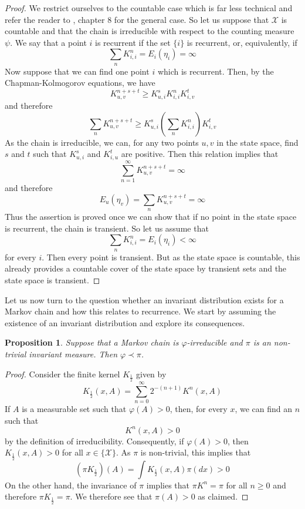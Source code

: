\documentclass[a4paper, draft]{article}
\theoremstyle{own}
\newtheorem{prop}[thm]{Proposition}
\theoremstyle{remark}
\begin{document}
\begin{proof}
	We restrict ourselves to the countable case which is far less technical and refer the reader to \cite{MeynTweedie}, chapter 8 for the general case. So let us suppose that ${\mathcal X}$ is countable and that the chain is irreducible with respect to the counting measure $\psi$. We say that a point $i$ is recurrent if the set $\{ i \}$ is recurrent, or, equivalently, if
	$$
	\sum_n K^n_{i,i} =  E_i(\eta_i) = \infty
	$$
	Now suppose that we can find one point $i$ which is recurrent. Then, by the Chapman-Kolmogorov equations, we have
	$$
	K^{n+s+t}_{u,v} \geq K^s_{u,i} K^n_{i,i} K^t_{i,v}
	$$
	and therefore
	$$
	\sum_n K^{n+s+t}_{u,v} \geq K^s_{u,i} (\sum_n K^n_{i,i}) K^t_{i,v}
	$$
	As the chain is irreducible, we can, for any two points $u,v$ in the state space, find $s$ and $t$ such that  $K^s_{u,i}$ and $K^t_{i,u}$ are positive. Then this relation implies that
	$$
	\sum_{n=1}^\infty K^{n+s+t}_{u,v} = \infty
	$$
	and therefore
	$$
	E_u(\eta_v) = \sum_n K^{n+s+t}_{u,v} = \infty
	$$
	Thus the assertion is proved once we can show that if no point in the state space is recurrent, the chain is transient. So let us assume that
	$$
	\sum_n K^n_{i,i} =  E_i(\eta_i) < \infty
	$$
	for every $i$. Then every point is transient. But as the state space is countable, this already provides a countable cover of the state space by transient sets and the state space is transient.
\end{proof}



Let us now turn to the question whether an invariant distribution exists for a Markov chain and how this relates to recurrence. We start by assuming the existence of an invariant distribution and explore its consequences. 

\begin{prop}\label{prop:invariantimpliesmaximal}
	Suppose that a Markov chain is $\varphi$-irreducible and $\pi$ is an non-trivial invariant measure. Then
	$\varphi \prec \pi$.
\end{prop}

\begin{proof}
	Consider the finite kernel $K_{\frac{1}{2}}$ given by
	$$
	K_{\frac{1}{2}} (x,A) = \sum_{n=0}^\infty 2^{-(n+1)} K^n(x,A)
	$$
	If $A$ is a measurable set such that $\varphi(A) > 0$, then, for every $x$, we can find an $n$ such that
	$$
	K^n(x,A) > 0
	$$
	by the definition of irreducibility. Consequently, if $\varphi(A) > 0$, then $K_{\frac{1}{2}}(x,A) > 0$ for all $x \in \{\mathcal X\}$. As $\pi$ is non-trivial, this implies that
	$$
	(\pi K_{\frac{1}{2}})(A) = \int K_{\frac{1}{2}}(x,A) \pi(dx) > 0 
	$$
	On the other hand, the invariance of $\pi$ implies that $\pi K^n = \pi$ for all $n \geq 0$ and therefore $\pi K_{\frac{1}{2}} = \pi$. We therefore see that $\pi(A) > 0$ as claimed.
\end{proof}
\end{document}
